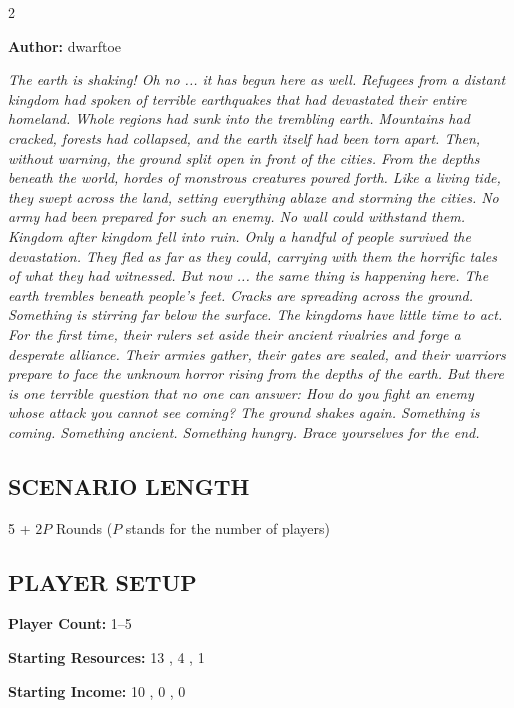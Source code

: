 
\begin{multicols*}{2}

\textbf{Author:} dwarftoe

\textit{The earth is shaking! Oh no ... it has begun here as well. Refugees from a distant kingdom had spoken of terrible earthquakes that had devastated their entire homeland. Whole regions had sunk into the trembling earth. Mountains had cracked, forests had collapsed, and the earth itself had been torn apart. Then, without warning, the ground split open in front of the cities. From the depths beneath the world, hordes of monstrous creatures poured forth. Like a living tide, they swept across the land, setting everything ablaze and storming the cities. No army had been prepared for such an enemy. No wall could withstand them. Kingdom after kingdom fell into ruin. Only a handful of people survived the devastation. They fled as far as they could, carrying with them the horrific tales of what they had witnessed. But now ... the same thing is happening here. The earth trembles beneath people's feet. Cracks are spreading across the ground. Something is stirring far below the surface. The kingdoms have little time to act. For the first time, their rulers set aside their ancient rivalries and forge a desperate alliance. Their armies gather, their gates are sealed, and their warriors prepare to face the unknown horror rising from the depths of the earth. But there is one terrible question that no one can answer: How do you fight an enemy whose attack you cannot see coming? The ground shakes again. Something is coming. Something ancient. Something hungry. Brace yourselves for the end.}

\subsection*{\MakeUppercase{Scenario Length}} 5 + $2P$ Rounds ($P$ stands for the number of players)

\subsection*{\MakeUppercase{Player Setup}}
\textbf{Player Count:} 1--5

\textbf{Starting Resources:} 13 , 4 , 1 

\textbf{Starting Income:} 10 , 0 , 0 


\end{multicols*}
